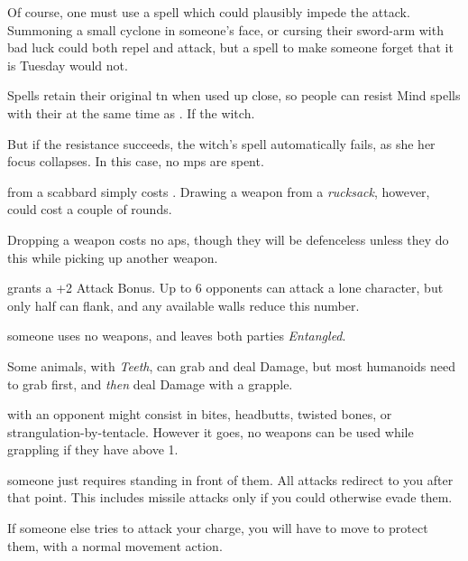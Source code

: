 \begin{multicols}{2}
Of course, one must use a spell which could plausibly impede the attack.
Summoning a small cyclone in someone's face, or cursing their sword-arm with bad luck could both repel and attack, but a spell to make someone forget that it is Tuesday would not.

Spells retain their original \gls{tn} when used up close, so people can resist Mind spells with their  at the same time as .
If the \gls{witch}.

But if the  resistance succeeds, the \gls{witch}'s spell automatically fails, as she her focus collapses.
In this case, no \glspl{mp} are spent.

from a scabbard simply costs .
Drawing a weapon from a \textit{rucksack}, however, could cost a couple of rounds.

Dropping a weapon costs no \glspl{ap}, though they will be defenceless unless they do this while picking up another weapon.


grants a +2 Attack Bonus.
Up to 6 opponents can attack a lone character, but only half can flank, and any available walls reduce this number.

someone uses no weapons, and leaves both parties \textit{Entangled}.

Some animals, with \textit{Teeth}, can grab and deal Damage, but most humanoids need to grab first, and \emph{then} deal Damage with a grapple.

\label{grappling}
with an opponent might consist in bites, headbutts, twisted bones, or strangulation-by-tentacle.
However it goes, no weapons can be used while grappling if they have  above 1.

someone just requires standing in front of them.
All attacks redirect to you after that point.
This includes missile attacks only if you could otherwise evade them.

If someone else tries to attack your charge, you will have to move to protect them, with a normal movement action.


\end{multicols}
